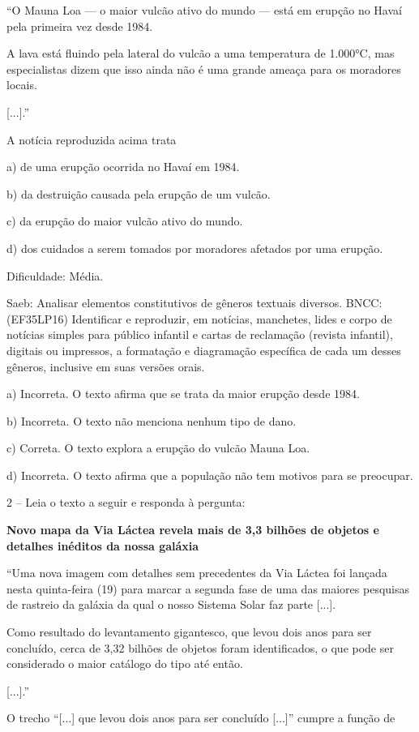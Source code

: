 ``O Mauna Loa --- o maior vulcão ativo do mundo --- está em erupção no
Havaí pela primeira vez desde 1984.

A lava está fluindo pela lateral do vulcão a uma temperatura de 1.000°C,
mas especialistas dizem que isso ainda não é uma grande ameaça para os
moradores locais.

{[}...{]}.''

A notícia reproduzida acima trata

a) de uma erupção ocorrida no Havaí em 1984.

b) da destruição causada pela erupção de um vulcão.

c) da erupção do maior vulcão ativo do mundo.

d) dos cuidados a serem tomados por moradores afetados por uma erupção.

Dificuldade: Média.

Saeb: Analisar elementos constitutivos de gêneros textuais diversos.
BNCC: (EF35LP16) Identificar e reproduzir, em notícias, manchetes, lides
e corpo de notícias simples para público infantil e cartas de reclamação
(revista infantil), digitais ou impressos, a formatação e diagramação
específica de cada um desses gêneros, inclusive em suas versões orais.

a) Incorreta. O texto afirma que se trata da maior erupção desde 1984.

b) Incorreta. O texto não menciona nenhum tipo de dano.

c) Correta. O texto explora a erupção do vulcão Mauna Loa.

d) Incorreta. O texto afirma que a população não tem motivos para se
preocupar.

2 -- Leia o texto a seguir e responda à pergunta:

\textbf{Novo mapa da Via Láctea revela mais de 3,3 bilhões de objetos e
detalhes inéditos da nossa galáxia}

``Uma nova imagem com detalhes sem precedentes da Via Láctea foi lançada
nesta quinta-feira (19) para marcar a segunda fase de uma das maiores
pesquisas de rastreio da galáxia da qual o nosso Sistema Solar faz parte
{[}...{]}.

Como resultado do levantamento gigantesco, que levou dois anos para ser
concluído, cerca de 3,32 bilhões de objetos foram identificados, o que
pode ser considerado o maior catálogo do tipo até então.

{[}...{]}.''

O trecho ``{[}...{]} que levou dois anos para ser concluído {[}...{]}''
cumpre a função de

